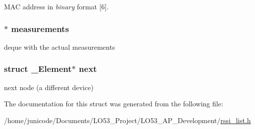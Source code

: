 M\+A\+C address in {\itshape binary} format \mbox{[}6\mbox{]}. 

\hypertarget{struct___element_a6b1eaa74e75a3aec587b2c7cdb72739f}{}
\subsubsection[{measurements}]{$\ast$ measurements}\label{struct___element_a6b1eaa74e75a3aec587b2c7cdb72739f}


deque with the actual measurements 

\hypertarget{struct___element_a831a79730f61d73039284f439e1995ec}{}
\subsubsection[{next}]{\setlength{\rightskip}{0pt plus 5cm}struct {\bf \+\_\+\+Element}$\ast$ next}\label{struct___element_a831a79730f61d73039284f439e1995ec}


next node (a different device) 



The documentation for this struct was generated from the following file\+:\begin{DoxyCompactItemize}
\item 
/home/junicode/\+Documents/\+L\+O53\+\_\+\+Project/\+L\+O53\+\_\+\+A\+P\+\_\+\+Development/\hyperlink{rssi__list_8h}{rssi\+\_\+list.\+h}\end{DoxyCompactItemize}

